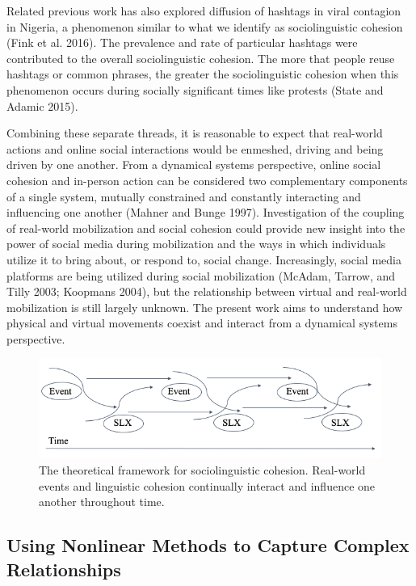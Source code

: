 \documentclass[
  english,
  man]{apa6}
\begin{document}
Related previous work has also explored diffusion of hashtags in viral contagion in
Nigeria, a phenomenon similar to what we identify as sociolinguistic cohesion
(Fink et al. 2016). The prevalence and rate of particular hashtags were
contributed to the overall sociolinguistic cohesion. The more that people
reuse hashtags or common phrases, the greater the sociolinguistic cohesion when
this phenomenon occurs during socially significant times like protests
(State and Adamic 2015).

Combining these separate threads, it is reasonable to expect that real-world
actions and online social interactions would be enmeshed, driving and being
driven by one another. From a dynamical systems perspective, online social
cohesion and in-person action can be considered two complementary components of
a single system, mutually constrained and constantly interacting and influencing
one another (Mahner and Bunge 1997). Investigation of the coupling of
real-world mobilization and social cohesion could provide new insight into the
power of social media during mobilization and the ways in which individuals
utilize it to bring about, or respond to, social change. Increasingly, social
media platforms are being utilized during social mobilization
(McAdam, Tarrow, and Tilly 2003; Koopmans 2004), but the relationship between virtual and real-world
mobilization is still largely unknown. The present work aims to understand how
physical and virtual movements coexist and interact from a dynamical systems
perspective.

\begin{figure}
\includegraphics[width=1\linewidth]{./figs/theoretical-framework} \caption{The theoretical framework for sociolinguistic cohesion. Real-world events and linguistic cohesion continually interact and influence one another throughout time.}\label{fig:theoretical-framework}
\end{figure}

\hypertarget{using-nonlinear-methods-to-capture-complex-relationships}{%
\subsection{Using Nonlinear Methods to Capture Complex Relationships}\label{using-nonlinear-methods-to-capture-complex-relationships}}
\end{document}
